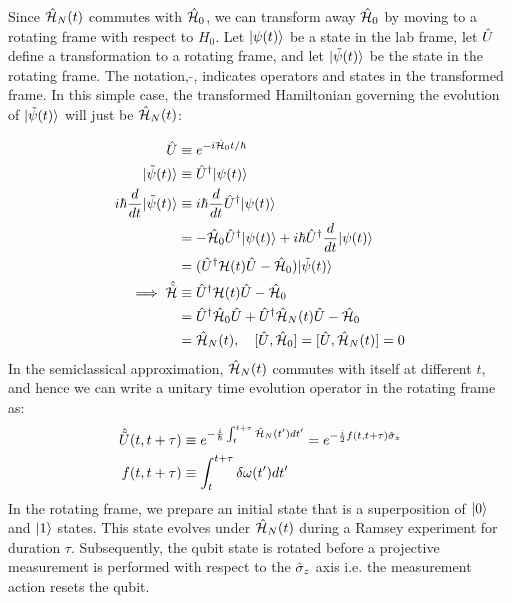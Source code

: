 Since $\hat{\mathcal{H}}_{N}(t)$ commutes with $\hat{\mathcal{H}}_0$, we can transform away $\hat{\mathcal{H}}_0$ by moving to a rotating frame with respect to $H_0$. Let $| \psi (t) \rangle$ be a state in the lab frame, let $\hat{U}$ define a transformation to a rotating frame, and let $| \tilde{\psi} (t) \rangle$ be the state in the rotating frame. The notation, $\tilde{}$, indicates operators and states in the transformed frame. In this simple case, the transformed Hamiltonian governing the evolution of $| \tilde{\psi} (t) \rangle$ will just be $\hat{\mathcal{H}}_{N}(t)$:

\begin{align}
\hat{U} &\equiv e^{-i\hat{\mathcal{H}}_0 t / \hbar } \\
| \tilde{\psi} (t) \rangle &\equiv \hat{U}^\dagger | \psi (t) \rangle \\
i \hbar \frac{d}{dt} | \tilde{\psi} (t) \rangle & \equiv i \hbar \frac{d}{dt} \hat{U}^\dagger | \psi (t) \rangle \\
&= -\hat{\mathcal{H}}_0 \hat{U}^\dagger | \psi (t) \rangle + i\hbar \hat{U}^\dagger \frac{d}{dt} | \psi (t) \rangle \\
& =  ( \hat{U}^\dagger \mathcal{H}(t) \hat{U} -\hat{\mathcal{H}}_0  ) | \tilde{\psi} (t) \rangle \\
\implies \hat{\tilde{\mathcal{H}}} &\equiv \hat{U}^\dagger \mathcal{H}(t) \hat{U} -\hat{\mathcal{H}}_0 \\
& = \hat{U}^\dagger \hat{\mathcal{H}}_0\hat{U}  + \hat{U}^\dagger \hat{\mathcal{H}}_{N}(t) \hat{U} -\hat{\mathcal{H}}_0 \\
& = \hat{\mathcal{H}}_{N}(t),  \quad [\hat{U}, \hat{\mathcal{H}}_0 ] = [\hat{U}, \hat{\mathcal{H}}_{N}(t) ] = 0 \\
\end{align}
In the semiclassical approximation,  $\hat{\mathcal{H}}_{N}(t)$ commutes with itself at different $t$, and hence we can write a unitary time evolution operator in the rotating frame as:
\begin{align}
\hat{\tilde{U}}(t, t + \tau) &\equiv  e^{-\frac{i}{\hbar}  \int_{t}^{t + \tau} \hat{\mathcal{H}}_{N}(t') dt'  } = e^{-\frac{i}{2} f(t, t + \tau) \hat{\sigma}_{z} } \\
f(t, t + \tau) & \equiv  \int_{t}^{t + \tau} \delta \omega (t') dt' \label{eqn:app:phases}
\end{align}
In the rotating frame, we prepare an initial state that is a superposition of $| 0 \rangle$ and $| 1 \rangle$ states. This state evolves under $\hat{\mathcal{H}}_{N} (t)$ during a Ramsey experiment for duration $\tau$.  Subsequently, the qubit state is rotated before a projective measurement is performed with respect to the $\hat{\sigma}_{z}$ axis i.e. the measurement action resets the qubit. 

